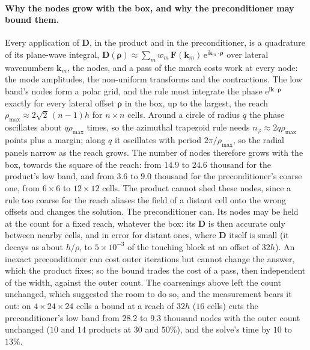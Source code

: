 \documentclass[11pt,a4paper]{article}
\newcommand{\bk}{\mathbf{k}}
\newcommand{\brho}{\boldsymbol{\rho}}
\newcommand{\ii}{\mathrm{i}}
\newcommand{\ee}{\mathrm{e}}
\begin{document}
\paragraph{Why the nodes grow with the box, and why the preconditioner may bound them.} Every application of
$\mathbf D$, in the product and in the preconditioner, is a quadrature of its plane-wave integral,
$\mathbf D(\brho)\approx\sum_m w_m\,\mathbf F(\bk_m)\,\ee^{\ii\bk_m\cdot\brho}$ over lateral wavenumbers $\bk_m$,
the nodes, and a pass of the march costs work at every node: the mode amplitudes, the non-uniform transforms and
the contractions. The low band's nodes form a polar grid, and the rule must integrate the phase
$\ee^{\ii\bk\cdot\brho}$ exactly for every lateral offset $\brho$ in the box, up to the largest, the reach
$\rho_{\max}\approx2\sqrt2\,(n-1)h$ for $n\times n$ cells. Around a circle of radius $q$ the phase oscillates about
$q\rho_{\max}$ times, so the azimuthal trapezoid rule needs $n_\varphi\approx2q\rho_{\max}$ points plus a margin;
along $q$ it oscillates with period $2\pi/\rho_{\max}$, so the radial panels narrow as the reach grows. The number
of nodes therefore grows with the box, towards the square of the reach: from $14.9$ to $24.6$ thousand for the
product's low band, and from $3.6$ to $9.0$ thousand for the preconditioner's coarse one, from $6\times6$ to
$12\times12$ cells. The product cannot shed these nodes, since a rule too coarse for the reach aliases the field of
a distant cell onto the wrong offsets and changes the solution. The preconditioner can. Its nodes may be held at
the count for a fixed reach, whatever the box: its $\mathbf D$ is then accurate only between nearby cells, and in
error for distant ones, where $\mathbf D$ itself is small (it decays as about $h/\rho$, to $5\times10^{-3}$ of the
touching block at an offset of $32h$). An inexact preconditioner can cost outer iterations but cannot change the answer,
which the product fixes; so the bound trades the cost of a pass, then independent of the width, against the outer
count. The coarsenings above left the count
unchanged, which suggested the room to do so, and the measurement bears it out: on $4\times24\times24$ cells a bound
at a reach of $32h$ ($16$ cells) cuts the preconditioner's low band from $28.2$ to $9.3$ thousand nodes with the
outer count unchanged ($10$ and $14$ products at $30$ and $50\%$), and the solve's time by $10$ to $13\%$.
\end{document}
